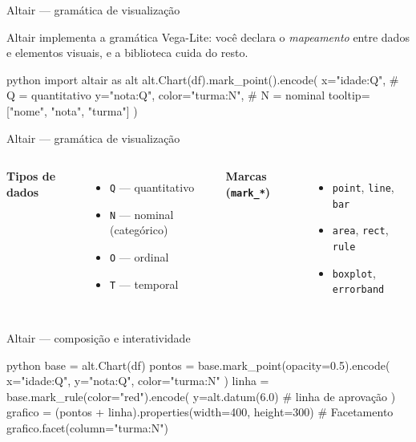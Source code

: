 \documentclass[xcolor=dvipsnames,t,aspectratio=169]{beamer}
\newcommand{\highlight}[1]{{\color{nes_dark_orange} #1}}
\begin{document}
\begin{frame}[c, fragile]{Altair — gramática de visualização}

Altair implementa a \highlight{gramática Vega-Lite}: você declara o \emph{mapeamento} entre dados e elementos visuais, e a biblioteca cuida do resto.

\begin{code}{python}
import altair as alt
alt.Chart(df).mark_point().encode(
    x="idade:Q",      # Q = quantitativo
    y="nota:Q",
    color="turma:N",  # N = nominal
    tooltip=["nome", "nota", "turma"]
)
\end{code}
\end{frame}

\begin{frame}[c, fragile]{Altair — gramática de visualização}
\begin{columns}
\textbf{\color{nes_dark_purple}Tipos de dados}
\begin{itemize}
    \item \texttt{Q} — quantitativo
    \item \texttt{N} — nominal (categórico)
    \item \texttt{O} — ordinal
    \item \texttt{T} — temporal
\end{itemize}

\textbf{\color{nes_dark_purple}Marcas (\texttt{mark\_*})}
\begin{itemize}
    \item \texttt{point}, \texttt{line}, \texttt{bar}
    \item \texttt{area}, \texttt{rect}, \texttt{rule}
    \item \texttt{boxplot}, \texttt{errorband}
\end{itemize}
\end{columns}

\end{frame}


\begin{frame}[c, fragile]{Altair — composição e interatividade}

\begin{code}{python}
base = alt.Chart(df)
pontos = base.mark_point(opacity=0.5).encode(
    x="idade:Q", y="nota:Q", color="turma:N"
)
linha = base.mark_rule(color="red").encode(
    y=alt.datum(6.0)          # linha de aprovação
)
grafico = (pontos + linha).properties(width=400, height=300)
# Facetamento
grafico.facet(column="turma:N")
\end{code}
\end{frame}
\end{document}
